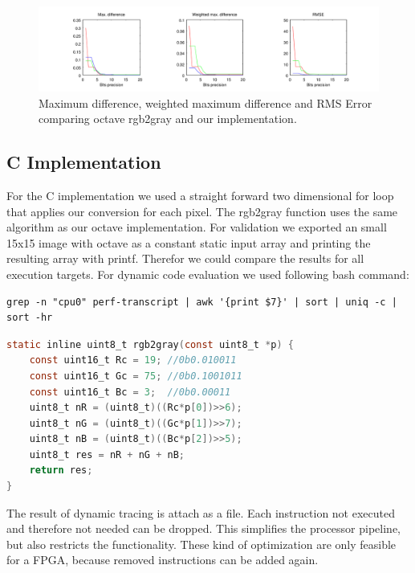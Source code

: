 \documentclass[a4paper]{scrartcl}
\begin{document}
\begin{figure}[h]
  \centering
  \includegraphics[width=\textwidth]{gray_error} 
  \caption{Maximum difference, weighted maximum difference and RMS Error comparing octave rgb2gray and our implementation.}
\end{figure}


\subsection{C Implementation}

For the C implementation we used a straight forward two dimensional for loop that applies our conversion for each pixel. The rgb2gray function uses the same algorithm as our octave implementation. For validation we exported an small 15x15 image with octave as a constant static input array and printing the resulting array with printf. Therefor we could compare the results for all execution targets. For dynamic code evaluation we used following bash command:

\begin{minipage}{\linewidth}
\begin{lstlisting}
grep -n "cpu0" perf-transcript | awk '{print $7}' | sort | uniq -c | sort -hr
\end{lstlisting}
\end{minipage}

\begin{minipage}{\linewidth}
\begin{lstlisting}[language=C]
static inline uint8_t rgb2gray(const uint8_t *p) {
	const uint16_t Rc = 19; //0b0.010011
	const uint16_t Gc = 75; //0b0.1001011
	const uint16_t Bc = 3;  //0b0.00011
	uint8_t nR = (uint8_t)((Rc*p[0])>>6);
	uint8_t nG = (uint8_t)((Gc*p[1])>>7);
	uint8_t nB = (uint8_t)((Bc*p[2])>>5);
	uint8_t res = nR + nG + nB;
	return res;
}
\end{lstlisting}
\end{minipage}

The result of dynamic tracing is attach as a file. Each instruction not executed and therefore not needed can be dropped. This simplifies the processor pipeline, but also restricts the functionality. These kind of optimization are only feasible for a FPGA, because removed instructions can be added again. 
\end{document}

